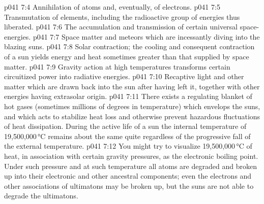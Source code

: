 \vs p041 7:4 \bibnobreakspace Annihilation of atoms and, eventually, of electrons.
\vs p041 7:5 \bibnobreakspace Transmutation of elements, including the radioactive group of energies thus liberated.
\vs p041 7:6 \bibnobreakspace The accumulation and transmission of certain universal space\hyp{}energies.
\vs p041 7:7 \bibnobreakspace Space matter and meteors which are incessantly diving into the blazing suns.
\vs p041 7:8 \bibnobreakspace Solar contraction; the cooling and consequent contraction of a sun yields energy and heat sometimes greater than that supplied by space matter.
\vs p041 7:9 \bibnobreakspace Gravity action at high temperatures transforms certain circuitized power into radiative energies.
\vs p041 7:10 \bibnobreakspace Recaptive light and other matter which are drawn back into the sun after having left it, together with other energies having extrasolar origin.
\vs p041 7:11 \pc There exists a regulating blanket of hot gases (sometimes millions of degrees in temperature) which envelops the suns, and which acts to stabilize heat loss and otherwise prevent hazardous fluctuations of heat dissipation. During the active life of a sun the internal temperature of 19,500,000\,°C remains about the same quite regardless of the progressive fall of the external temperature.
\vs p041 7:12 \pc You might try to visualize 19,500,000\,°C of heat, in association with certain gravity pressures, as the electronic boiling point. Under such pressure and at such temperature all atoms are degraded and broken up into their electronic and other ancestral components; even the electrons and other associations of ultimatons may be broken up, but the suns are not able to degrade the ultimatons.
